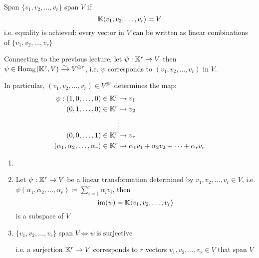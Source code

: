 

\begin{definition} {Span}
    \(\{v_1, v_2, \dots, v_r\}\) span \(V\) if \[
        \mathbb{K}\langle v_1, v_2, \dots, v_r \rangle = V
    \]
    i.e. equality is achieved: every vector in \(V\) can be written as linear combinations of \(\{v_1, v_2, \dots, v_r\}\)
\end{definition}

Connecting to the previous lecture, let \(\psi: \mathbb{K}^r \to V\) then \(\psi \in \mathrm{Hom}_{\mathbb{K}}(\mathbb{K}^r, V) \xrightarrow{\sim} V^{\oplus r}\), i.e. \(\psi\) corresponds to \((v_1, v_2, \dots, v_r)\) in \(V\).

In particular, \((v_1, v_2, \dots, v_r) \in V^{\oplus r}\) determines the map:
\begin{align*}
    \psi: (1, 0, \dots, 0) \in \mathbb{K}^r                & \to v_1                                             \\
    (0, 1, \dots, 0) \in \mathbb{K}^r                      & \to v_2                                             \\
                                                     & \vdots                                              \\
    (0, 0, \dots, 1) \in \mathbb{K}^r                      & \to v_r                                             \\
    (\alpha_1, \alpha_2, \dots, \alpha_r) \in \mathbb{K}^r & \to \alpha_1v_1 + \alpha_2v_2 + \dots + \alpha_rv_r
\end{align*}

\begin{lemma}
    \begin{enumerate}
        \item[]
        \item Let \(\psi: \mathbb{K}^r \to V\) be a linear transformation determined by \(v_1, v_2, \dots, v_r \in V\), i.e. \(\psi(\alpha_1, \alpha_2, \dots, \alpha_r) \coloneqq \sum_{i=1}^r \alpha_iv_i\), then \[
                  \mathrm{im}(\psi) = \mathbb{K}\langle v_1, v_2, \dots, v_r \rangle
              \] is a subspace of \(V\)
        \item \(\{v_1, v_2, \dots, v_r\}\) span \(V \Leftrightarrow \psi \:\text{is surjective}\: \)

              i.e. a surjection \(\mathbb{K}^r \to V\) corresponds to \(r\) vectors \(v_1, v_2, \dots, v_r \in V\) that span \(V\)
    \end{enumerate}
\end{lemma}

